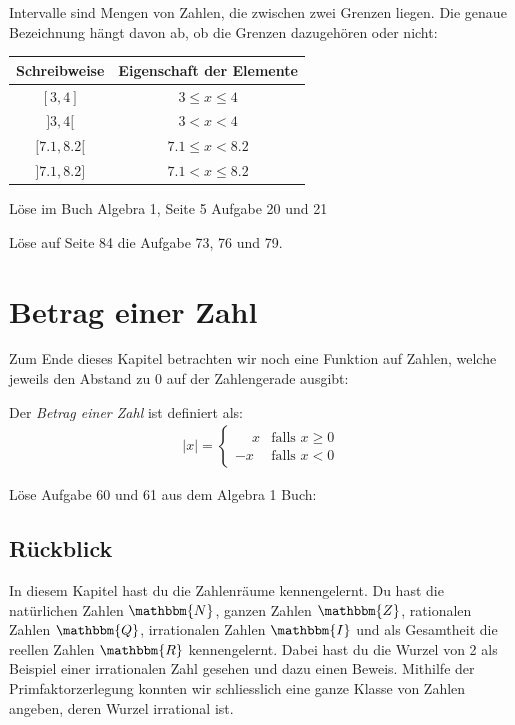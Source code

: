 Intervalle sind Mengen von Zahlen, die zwischen zwei Grenzen liegen. Die genaue Bezeichnung hängt davon ab, ob die Grenzen dazugehören oder nicht:\\
\begin{center}
\begin{tabular}{c|c}
Schreibweise & Eigenschaft der Elemente\\\hline
$[3,4]$& $3 \leq x\leq 4$\\\hline
$]3,4[$& $3 < x < 4$\\\hline
$ [7.1,8.2[$& $7.1\leq x < 8.2$\\\hline
$]7.1,8.2]$& $7.1 < x \leq 8.2$
\end{tabular}
\end{center}
\begin{aufgabe}
Löse im Buch Algebra 1, Seite 5 Aufgabe 20 und 21
\end{aufgabe}
\begin{aufgabe}
Löse auf Seite 84 die Aufgabe 73, 76 und 79.
\end{aufgabe}
\section{Betrag einer Zahl}
Zum Ende dieses Kapitel betrachten wir noch eine Funktion auf Zahlen, welche jeweils den Abstand zu 0 auf der Zahlengerade ausgibt:

\begin{definition}
Der \emph{Betrag einer Zahl} ist definiert als:
\begin{align*}
|x|= \begin{cases} 
\phantom{-} x & \text{falls } x \geq 0\\
-x & \text{falls } x<0
\end{cases}
\end{align*}
\end{definition}


\begin{aufgabe}
Löse Aufgabe 60 und 61 aus dem Algebra 1 Buch:



\end{aufgabe}

\subsection*{Rückblick}
In diesem Kapitel hast du die Zahlenräume kennengelernt. Du hast die natürlichen Zahlen $\mathbbm{N}$, ganzen Zahlen $\mathbbm{Z}$, rationalen Zahlen $\mathbbm{Q}$, irrationalen Zahlen $\mathbbm{I}$ und als Gesamtheit die reellen Zahlen $\mathbbm{R}$ kennengelernt. Dabei hast du die Wurzel von 2 als Beispiel einer irrationalen Zahl gesehen und dazu einen Beweis. Mithilfe der Primfaktorzerlegung konnten wir schliesslich eine ganze Klasse von Zahlen angeben, deren Wurzel irrational ist.
